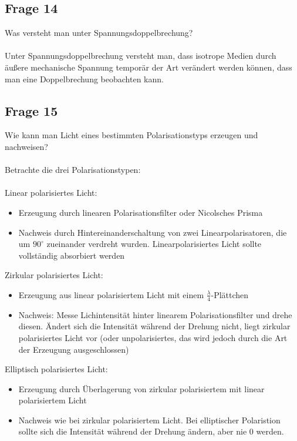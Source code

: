 \documentclass[a4paper,10pt]{scrartcl}
\begin{document}
	    	
	    \subsection{Frage 14}
		    Was versteht man unter Spannungsdoppelbrechung?\\
		    \\
		    Unter Spannungsdoppelbrechung versteht man, dass isotrope Medien durch äußere mechanische Spannung temporär der Art verändert werden können, dass man eine Doppelbrechung beobachten kann.
		    
		\subsection{Frage 15}
			Wie kann man Licht eines bestimmten Polarisationstyps erzeugen und nachweisen?\\
			\\
			Betrachte die drei Polarisationstypen:\\
			\\
			Linear polarisiertes Licht:
			\begin{itemize}
				\item Erzeugung durch linearen Polarisationsfilter oder Nicolsches Prisma
				\item Nachweis durch Hintereinanderschaltung von zwei Linearpolarisatoren, die um \(90^{\circ}\) zueinander verdreht wurden. Linearpolarisiertes Licht sollte vollständig absorbiert werden
			\end{itemize}
			
			Zirkular polarisiertes Licht:
			\begin{itemize}
				\item Erzeugung aus linear polarisiertem Licht mit einem \(\frac{\lambda}{4}\)-Plättchen
				\item Nachweis: Messe Lichintensität hinter linearem Polarisationsfilter und drehe diesen. Ändert sich die Intensität während der Drehung nicht, liegt zirkular polarisiertes Licht vor (oder unpolarisiertes, das wird jedoch durch die Art der Erzeugung ausgeschlossen)
			\end{itemize}
			
			Elliptisch polarisiertes Licht:
			\begin{itemize}
				\item Erzeugung durch Überlagerung von zirkular polarisiertem mit linear polarisiertem Licht
				\item Nachweis wie bei zirkular polarisiertem Licht. Bei elliptischer Polaristion sollte sich die Intensität während der Drehung ändern, aber nie 0 werden.
			\end{itemize}
			
	
\end{document}
